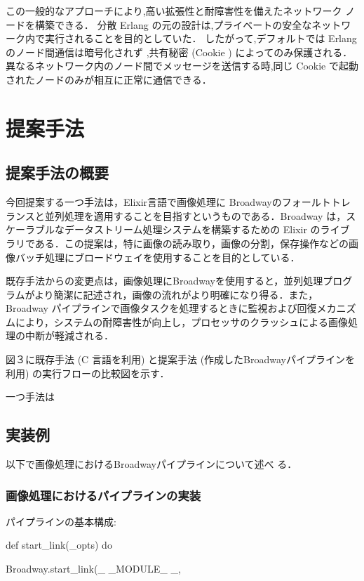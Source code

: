 \documentclass[a4paper]{jreport}	%
\begin{document}
この一般的なアプローチにより,高い拡張性と耐障害性を備えたネットワーク ノードを構築できる． 分散 Erlang の元の設計は,プライベートの安全なネットワーク内で実行されることを目的としていた． したがって,デフォルトでは Erlang のノード間通信は暗号化されず \cite{I},共有秘密 (Cookie ) によってのみ保護される．異なるネットワーク内のノード間でメッセージを送信する時,同じ Cookie で起動されたノードのみが相互に正常に通信できる．




\chapter{提案手法}
\section{提案手法の概要}
今回提案する一つ手法は，Elixir言語で画像処理に Broadwayのフォールトトレランスと並列処理を適用することを目指すというものである．Broadway は，スケーラブルなデータストリーム処理システムを構築するための Elixir のライブラリである．この提案は，特に画像の読み取り，画像の分割，保存操作などの画像バッチ処理にブロードウェイを使用することを目的としている． 

既存手法からの変更点は，画像処理にBroadwayを使用すると，並列処理プログラムがより簡潔に記述され，画像の流れがより明確になり得る．また，Broadway パイプラインで画像タスクを処理するときに監視および回復メカニズムにより，システムの耐障害性が向上し，プロセッサのクラッシュによる画像処理の中断が軽減される．


図３に既存手法 (C 言語を利用) と提案手法 (作成したBroadwayパイプラインを利用) の実行フローの比較図を示す．

一つ手法は


\section{実装例}
以下で画像処理におけるBroadwayパイプラインについて述べ
る．
\subsection{画像処理におけるパイプラインの実装}
パイプラインの基本構成:

def start\_link(\_opts) do

    Broadway.start\_link(\_ \_MODULE\_ \_,
    
\end{document}
